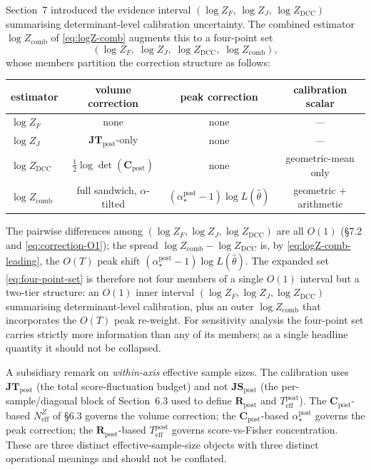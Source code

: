 \documentclass[11pt]{article}
\begin{document}
Section~7 introduced the evidence interval
$(\log Z_F,\,\log Z_J,\,\log Z_{\mathrm{DCC}})$ summarising determinant-level
calibration uncertainty. The combined estimator $\log Z_{\mathrm{comb}}$ of
\eqref{eq:logZ-comb} augments this to a four-point set
\begin{equation}
(\log Z_F,\;\log Z_J,\;\log Z_{\mathrm{DCC}},\;\log Z_{\mathrm{comb}}),
\label{eq:four-point-set}
\end{equation}
whose members partition the correction structure as follows:
\begin{center}
\renewcommand{\arraystretch}{1.2}
\begin{tabular}{lccc}
\hline
estimator & volume correction & peak correction & calibration scalar \\
\hline
$\log Z_F$           & none                                   & none & --- \\
$\log Z_J$           & $\mathbf{JT}_{\mathrm{post}}$-only     & none & --- \\
$\log Z_{\mathrm{DCC}}$ & $\tfrac{1}{2}\log\det(\mathbf C_{\mathrm{post}})$ & none & geometric-mean only \\
$\log Z_{\mathrm{comb}}$ & full sandwich, $\alpha$-tilted    & $(\alpha_\star^{\mathrm{post}}-1)\log L(\hat\theta)$ & geometric $+$ arithmetic \\
\hline
\end{tabular}
\end{center}
The pairwise differences among $(\log Z_F,\log Z_J,\log Z_{\mathrm{DCC}})$ are
all $O(1)$ (\S7.2 and \eqref{eq:correction-O1}); the spread
$\log Z_{\mathrm{comb}} - \log Z_{\mathrm{DCC}}$ is, by
\eqref{eq:logZ-comb-leading}, the $O(T)$ peak shift
$(\alpha_\star^{\mathrm{post}} - 1)\log L(\hat\theta)$. The expanded set
\eqref{eq:four-point-set} is therefore not four members of a single $O(1)$
interval but a two-tier structure: an $O(1)$ inner interval
$(\log Z_F, \log Z_J, \log Z_{\mathrm{DCC}})$ summarising determinant-level
calibration, plus an outer $\log Z_{\mathrm{comb}}$ that incorporates the
$O(T)$ peak re-weight. For sensitivity analysis the four-point set carries
strictly more information than any of its members; as a single headline
quantity it should not be collapsed.

A subsidiary remark on \emph{within-axis} effective sample sizes. The
calibration uses $\mathbf{JT}_{\mathrm{post}}$ (the total score-fluctuation
budget) and not $\mathbf{JS}_{\mathrm{post}}$ (the per-sample/diagonal block
of Section~6.3 used to define $\mathbf R_{\mathrm{post}}$ and
$T_{\mathrm{eff}}^{\mathrm{post}}$). The $\mathbf C_{\mathrm{post}}$-based
$N_{\mathrm{eff}}^{Z}$ of \S6.3 governs the volume correction; the
$\mathbf C_{\mathrm{post}}$-based $\alpha_\star^{\mathrm{post}}$ governs the
peak correction; the $\mathbf R_{\mathrm{post}}$-based
$T_{\mathrm{eff}}^{\mathrm{post}}$ governs score-vs-Fisher concentration. These
are three distinct effective-sample-size objects with three distinct
operational meanings and should not be conflated.
\end{document}
